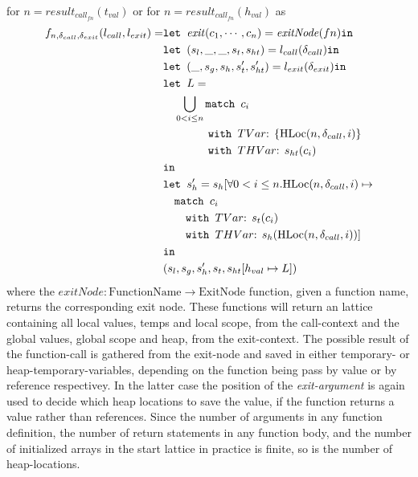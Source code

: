 for $n = \mathit{result}_{\mathit{call}_{fn}}(t_{val})$ or for $n = \mathit{result}_{\mathit{call}_{fn}}(h_{val})$ as 
\begin{align}
f_{n,\delta_{call}, \delta_{exit}}(l_{call}, l_{exit})=   &\texttt{let } \mathit{exit}(c_1, \cdots, c_n) = \mathit{exitNode}(fn) \texttt{in }\notag\\
                                                &\texttt{let } (s_l, \_, \_, s_t, s_{ht}) = l_{call}(\delta_{call}) \texttt{in }\notag\\
                                                &\texttt{let } (\_, s_g, s_h, s_t', s_{ht}') = l_{exit}(\delta_{exit}) \texttt{in }\notag\\
                                                &\texttt{let } L = \notag\\
                                                &\quad \bigcup_{0<i \leq n} \texttt{match }c_i\notag\\
                                                &\quad\quad\quad\quad \texttt{with }TVar\text{: } \{\text{HLoc}(n,\delta_{call}, i)\}\notag\\
                                                &\quad\quad\quad\quad \texttt{with }THVar\text{: } s_{ht}(c_i)\notag\\
                                                & \texttt{in }\notag\\
                                                &\texttt{let } s_h' = s_h[\forall 0 < i \leq n. \text{HLoc}(n,\delta_{call}, i) \mapsto\notag\\
                                                &\quad\texttt{match }c_i\notag\\
                                                &\quad\quad \texttt{with }TVar\text{: } s_t(c_i)\notag\\
                                                &\quad\quad \texttt{with }THVar\text{: } s_h(\text{HLoc}(n,\delta_{call}, i))]\notag\\
                                                & \texttt{in }\notag\\
                                                &(s_l,s_g,s_h', s_t, s_{ht}[h_{val}\mapsto L])
\end{align}
where the $\mathit{exitNode} : \text{FunctionName} \rightarrow \text{ExitNode}$ function, given a function name, returns the corresponding exit node. These functions will return an lattice containing all local values, temps and local scope, from the call-context and the global values, global scope and heap, from the exit-context. The possible result of the function-call is gathered from the exit-node and saved in either temporary- or heap-temporary-variables, depending on the function being pass by value or by reference respectivey. In the latter case the position of the \emph{exit-argument} is again used to decide which heap locations to save the value, if the function returns a value rather than references. Since the number of arguments  in any function definition, the number of return statements in any function body, and the number of initialized arrays in the start lattice in practice is finite, so is the number of heap-locations. 
